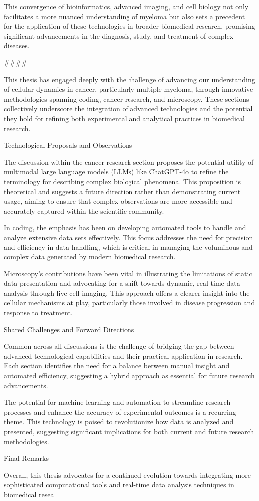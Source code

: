 This convergence of bioinformatics, advanced imaging, and cell biology not only
facilitates a more nuanced understanding of myeloma but also sets a precedent
for the application of these technologies in broader biomedical research,
promising significant advancements in the diagnosis, study, and treatment of
complex diseases.




####



This thesis has engaged deeply with the challenge of advancing our understanding
of cellular dynamics in cancer, particularly multiple myeloma, through
innovative methodologies spanning coding, cancer research, and microscopy. These
sections collectively underscore the integration of advanced technologies and
the potential they hold for refining both experimental and analytical practices
in biomedical research.

Technological Proposals and Observations

The discussion within the cancer research section proposes the potential utility
of multimodal large language models (LLMs) like ChatGPT-4o to refine the
terminology for describing complex biological phenomena. This proposition is
theoretical and suggests a future direction rather than demonstrating current
usage, aiming to ensure that complex observations are more accessible and
accurately captured within the scientific community.

In coding, the emphasis has been on developing automated tools to handle and
analyze extensive data sets effectively. This focus addresses the need for
precision and efficiency in data handling, which is critical in managing the
voluminous and complex data generated by modern biomedical research.

Microscopy’s contributions have been vital in illustrating the limitations of
static data presentation and advocating for a shift towards dynamic, real-time
data analysis through live-cell imaging. This approach offers a clearer insight
into the cellular mechanisms at play, particularly those involved in disease
progression and response to treatment.

Shared Challenges and Forward Directions

Common across all discussions is the challenge of bridging the gap between
advanced technological capabilities and their practical application in research.
Each section identifies the need for a balance between manual insight and
automated efficiency, suggesting a hybrid approach as essential for future
research advancements.

The potential for machine learning and automation to streamline research
processes and enhance the accuracy of experimental outcomes is a recurring
theme. This technology is poised to revolutionize how data is analyzed and
presented, suggesting significant implications for both current and future
research methodologies.

Final Remarks

Overall, this thesis advocates for a continued evolution towards integrating
more sophisticated computational tools and real-time data analysis techniques in
biomedical resea